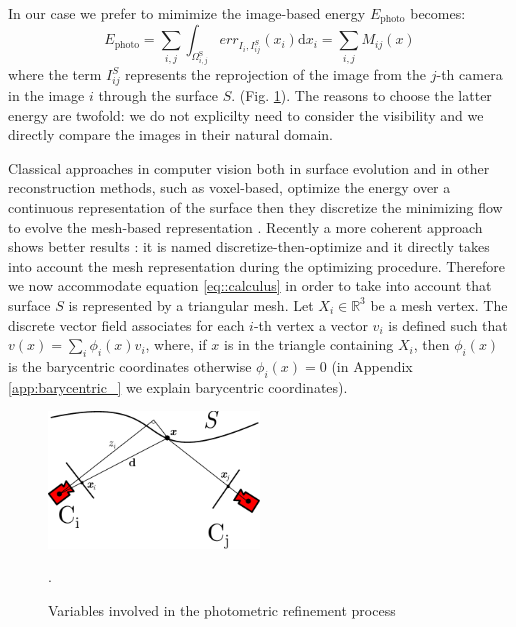 In our case we prefer to mimimize  \cite{pons2007multi} the image-based  energy $E_{\textrm{photo}}$ becomes:
\begin{equation}
\label{eq:energy_photo}
  E_{\textrm{photo}} = \sum_{i,j}\int_{\Omega^{\textrm{S}}_{i,j}} err_{I_i, I_{ij}^{\mathit{S}}}(x_i)\textrm{d}x_i = \sum_{i,j} \mathit{M}_{ij}(x)
\end{equation}
where the term $I_{ij}^{\mathit{S}}$ represents the reprojection of the image from the $j$-th camera in the image $i$ through the surface $\mathit{S}$.
(Fig. \ref{fig:cameraproj}).
The reasons to choose the latter energy are twofold: we do not explicilty need to consider the visibility and we directly compare the images in their natural domain.

Classical approaches in computer vision both in surface evolution and in other reconstruction methods, such as voxel-based, optimize the energy over a continuous representation of the surface then they discretize the minimizing flow to evolve the mesh-based representation \cite{pons2007multi,faugeras2002variational}. Recently a more coherent approach shows better results \cite{vu_et_al_2012,delaunoy_et_al_08}: it is named discretize-then-optimize and it directly takes into account the mesh representation during the optimizing procedure. 
Therefore we now accommodate equation \eqref{eq::calculus} in order to take into account that  surface $\mathit{S}$ is represented by a triangular mesh. 
Let $X_i \in \mathbb{R}^3$ be a mesh vertex. The discrete vector field associates for each $i$-th vertex a vector $v_i$ is defined such that $v(x) = \sum_i \phi_i(x) v_i$, where, if $x$ is in the triangle containing $X_i$, then $\phi_i(x)$ is the barycentric coordinates otherwise $\phi_i(x) = 0$ (in Appendix \ref{app:barycentric_} we explain barycentric coordinates).


\begin{figure}[t]
\centering
\includegraphics[width=0.5\textwidth]{./img/ch-incr-dens/cameproj}
\caption{Variables involved in the photometric refinement process}.
\label{fig:cameraproj}
\end{figure}

